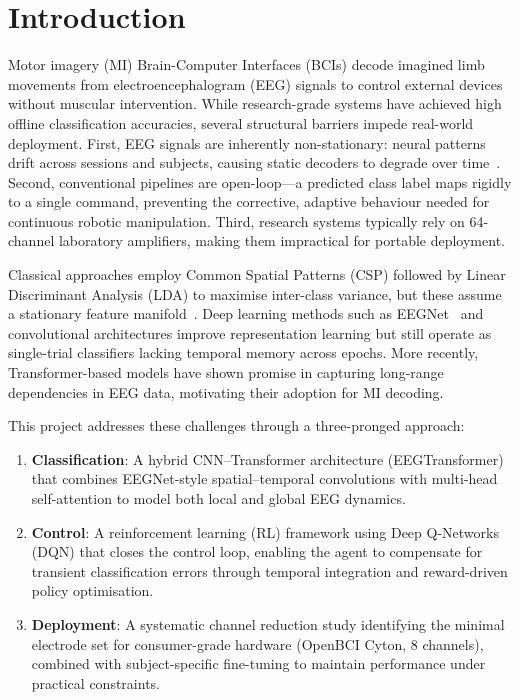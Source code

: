 \documentclass[12pt, a4paper]{article}
\begin{document}
\section{Introduction}

Motor imagery (MI) Brain-Computer Interfaces (BCIs) decode imagined limb movements from electroencephalogram (EEG) signals to control external devices without muscular intervention. While research-grade systems have achieved high offline classification accuracies, several structural barriers impede real-world deployment. First, EEG signals are inherently non-stationary: neural patterns drift across sessions and subjects, causing static decoders to degrade over time~\cite{hameed2025enhancing}. Second, conventional pipelines are open-loop---a predicted class label maps rigidly to a single command, preventing the corrective, adaptive behaviour needed for continuous robotic manipulation. Third, research systems typically rely on 64-channel laboratory amplifiers, making them impractical for portable deployment.

Classical approaches employ Common Spatial Patterns (CSP) followed by Linear Discriminant Analysis (LDA) to maximise inter-class variance, but these assume a stationary feature manifold~\cite{hameed2025enhancing}. Deep learning methods such as EEGNet~\cite{lawhern2018eegnet} and convolutional architectures improve representation learning but still operate as single-trial classifiers lacking temporal memory across epochs. More recently, Transformer-based models have shown promise in capturing long-range dependencies in EEG data, motivating their adoption for MI decoding.

This project addresses these challenges through a three-pronged approach:
\begin{enumerate}
    \item \textbf{Classification}: A hybrid CNN--Transformer architecture (EEGTransformer) that combines EEGNet-style spatial--temporal convolutions with multi-head self-attention to model both local and global EEG dynamics.
    \item \textbf{Control}: A reinforcement learning (RL) framework using Deep Q-Networks (DQN) that closes the control loop, enabling the agent to compensate for transient classification errors through temporal integration and reward-driven policy optimisation.
    \item \textbf{Deployment}: A systematic channel reduction study identifying the minimal electrode set for consumer-grade hardware (OpenBCI Cyton, 8 channels), combined with subject-specific fine-tuning to maintain performance under practical constraints.
\end{enumerate}
\end{document}
